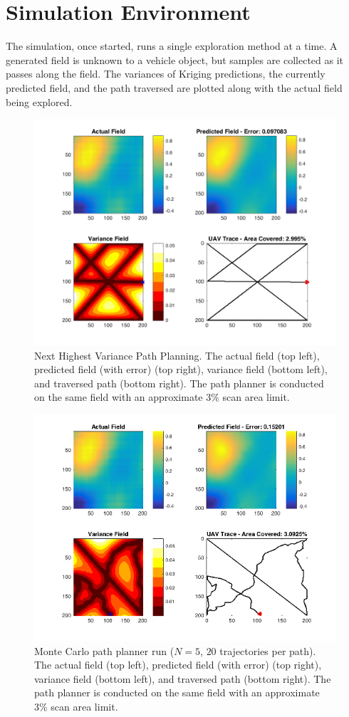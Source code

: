 \section{Simulation Environment}
The simulation, once started, runs a single exploration method at a time. A generated field is unknown to a vehicle object, but samples are collected as it passes along the field. The variances of Kriging predictions, the currently predicted field, and the path traversed are plotted along with the actual field being explored.

\begin{figure}[htb!]
    \centering
    \includegraphics[width=0.8\linewidth]{figures/nhv_200x200_10_percent.png}
	\captionsetup{skip=0.25\baselineskip,size=footnotesize}
	\caption{Next Highest Variance Path Planning. The actual field (top left), predicted field (with error) (top right), variance field (bottom left), and traversed path (bottom right). The path planner is conducted on the same field with an approximate 3\% scan area limit.}
\end{figure}
\begin{figure}[htb!]
    \centering
    \includegraphics[width=0.8\linewidth]{figures/mcpp_200x200_3_percent_mck_5_rands_20.png}
	\captionsetup{skip=0.25\baselineskip,size=footnotesize}
	\caption{Monte Carlo path planner run ($N=5$, $20$ trajectories per path). The actual field (top left), predicted field (with error) (top right), variance field (bottom left), and traversed path (bottom right). The path planner is conducted on the same field with an approximate 3\% scan area limit.}
\end{figure}
